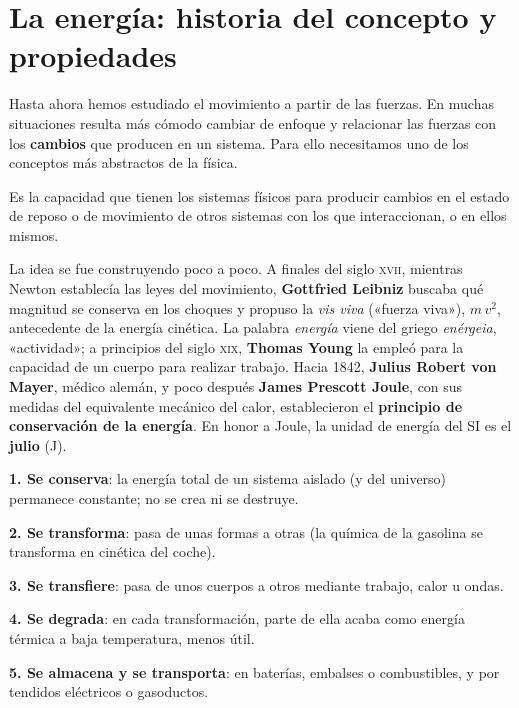 \section{La energía: historia del concepto y propiedades}\label{sec:ud12-energia}

Hasta ahora hemos estudiado el movimiento a partir de las fuerzas. En muchas situaciones resulta más cómodo cambiar de enfoque y
relacionar las fuerzas con los \textbf{cambios} que producen en un sistema. Para ello necesitamos uno de los conceptos más abstractos
de la física.

\begin{definition}[Energía]
    Es la capacidad que tienen los sistemas físicos para producir cambios en el estado de reposo o de movimiento de otros sistemas con
    los que interaccionan, o en ellos mismos.
\end{definition}

La idea se fue construyendo poco a poco. A finales del siglo \textsc{xvii}, mientras Newton establecía las leyes del movimiento,
\textbf{Gottfried Leibniz} buscaba qué magnitud se conserva en los choques y propuso la \textit{vis viva} («fuerza viva»),
\(m\,v^2\), antecedente de la energía cinética. La palabra \textit{energía} viene del griego \textit{enérgeia}, «actividad»; a principios
del siglo \textsc{xix}, \textbf{Thomas Young} la empleó para la capacidad de un cuerpo para realizar trabajo. Hacia 1842, \textbf{Julius
Robert von Mayer}, médico alemán, y poco después \textbf{James Prescott Joule}, con sus medidas del equivalente mecánico del calor,
establecieron el \textbf{principio de conservación de la energía}. En honor a Joule, la unidad de energía del SI es el \textbf{julio}
(J).

\begin{definition}
    \textbf{1. Se conserva}: la energía total de un sistema aislado (y del universo) permanece constante; no se crea ni se destruye.

    \textbf{2. Se transforma}: pasa de unas formas a otras (la química de la gasolina se transforma en cinética del coche).

    \textbf{3. Se transfiere}: pasa de unos cuerpos a otros mediante trabajo, calor u ondas.

    \textbf{4. Se degrada}: en cada transformación, parte de ella acaba como energía térmica a baja temperatura, menos útil.

    \textbf{5. Se almacena y se transporta}: en baterías, embalses o combustibles, y por tendidos eléctricos o gasoductos.
\end{definition}

